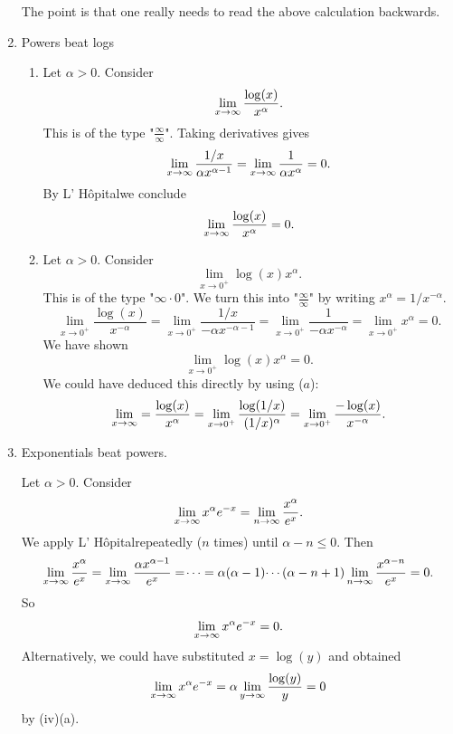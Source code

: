 \documentclass[10pt, a4paper]{article}
\newcommand{\lhopital}[0]{L' H\^opital}
\begin{document}
\begin{example}
\begin{enumerate}[label = (\roman*)]
        The point is that one really needs to read the above calculation backwards.
        
        \item Powers beat logs
        \begin{enumerate}[label = (\alph*)]
            \item 
            Let $\alpha > 0$.
            Consider
            \[
            \liminfty[x]\frac{\log(x)}{x ^ {\alpha}}.
            \]
            This is of the type "$\frac{\infty}{\infty}$".
            Taking derivatives gives
            \[
            \liminfty[x]\frac{1 / x}{\alpha x ^ {\alpha - 1}} = \liminfty[x]\frac{1}{\alpha x ^ \alpha} = 0.
            \]
            By \lhopital we conclude
            \[
            \liminfty[x]\frac{\log(x)}{x ^ {\alpha}} = 0.
            \]

            \item
            Let $\alpha > 0$.
            Consider
            \[
            \lim_{x \rightarrow 0 ^ {+}}\log(x)x ^ {\alpha}.
            \]
            This is of the type "$\infty \cdot 0$".
            We turn this into "$\frac{\infty}{\infty}$" by writing $x ^ {\alpha} = 1 / x ^ {-\alpha}$.
            \[
            \lim_{x \rightarrow 0 ^ {+}}\frac{\log(x)}{x ^ {-\alpha}} = \lim_{x \rightarrow 0 ^ {+}}\frac{1 / x}{-\alpha x ^ {-\alpha - 1}} = \lim_{x \rightarrow 0 ^ {+}}\frac{1}{-\alpha x ^ {-\alpha}} = \lim_{x \rightarrow 0 ^ {+}}x ^ {\alpha} = 0.
            \]
            We have shown
            \[
            \lim_{x \rightarrow 0 ^ {+}}\log(x)x ^ {\alpha} = 0.
            \]
            We could have deduced this directly by using ($a$):
            \[
            \liminfty[x] = \frac{\log(x)}{x ^ {\alpha}} = \lim_{x \rightarrow 0 ^ {+}}\frac{\log(1 / x)}{(1 / x) ^ {\alpha}} = \lim_{x \rightarrow 0 ^ {+}}\frac{-\log(x)}{x ^ {-\alpha}}.
            \]
        \end{enumerate}
        \item Exponentials beat powers.

        Let $\alpha > 0$.
        Consider
        \[
        \liminfty[x]x ^ {\alpha}e ^ {-x} = \liminfty\frac{x ^ {\alpha}}{e ^ x}.
        \]
        We apply \lhopital repeatedly
        ($n$ times)
        until $\alpha - n \leq 0$.
        Then
        \[
        \liminfty[x]\frac{x ^ {\alpha}}{e ^ x} = \liminfty[x]\frac{\alpha x ^ {\alpha - 1}}{e ^ x} = \dotsi = \alpha(\alpha - 1)\dotsi(\alpha - n + 1)\liminfty\frac{x ^ {\alpha - n}}{e ^ x} = 0.
        \]
        So
        \[
        \liminfty[x]x ^ {\alpha}e ^ {-x} = 0.
        \]
        Alternatively,
        we could have substituted $x = \log(y)$ and obtained
        \[
        \liminfty[x]x ^ {\alpha}e ^ {-x} = \alpha\liminfty[y]\frac{\log(y)}{y} = 0
        \]
        by (iv)(a).
    \end{enumerate}
\end{example}
\end{document}
